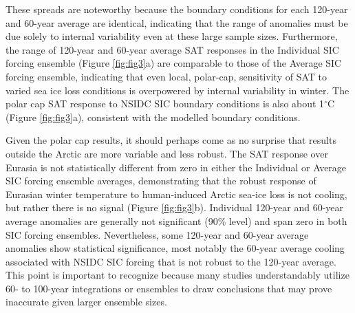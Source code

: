 \documentclass{nature}
\begin{document}
These spreads are noteworthy because the boundary conditions for each 120-year and 60-year average are identical, indicating that the range of anomalies must be due solely to internal variability even at these large sample sizes. Furthermore, the range of 120-year and 60-year average SAT responses in the Individual SIC forcing ensemble (Figure \ref{fig:fig3}a) are comparable to those of the Average SIC forcing ensemble, indicating that even local, polar-cap, sensitivity of SAT to varied sea ice loss conditions is overpowered by internal variability in winter. The polar cap SAT response to NSIDC SIC boundary conditions is also about 1$^\circ$C (Figure \ref{fig:fig3}a), consistent with the modelled boundary conditions.   %


Given the polar cap results, it should perhaps come as no surprise that results outside the Arctic are more variable and less robust. The SAT response over Eurasia is not statistically different from zero in either the Individual or Average SIC forcing ensemble averages, demonstrating that the robust response of Eurasian winter temperature to human-induced Arctic sea-ice loss is not cooling, but rather there is no signal (Figure \ref{fig:fig3}b). Individual 120-year and 60-year average anomalies are generally not significant (90\% level) and span zero in both SIC forcing ensembles. Nevertheless, some 120-year and 60-year average anomalies show statistical significance, most notably the 60-year average cooling associated with NSIDC SIC forcing that is not robust to the 120-year average. This point is important to recognize because many studies understandably utilize 60- to 100-year integrations or ensembles to draw conclusions that may prove inaccurate given larger ensemble sizes.%
\end{document}
